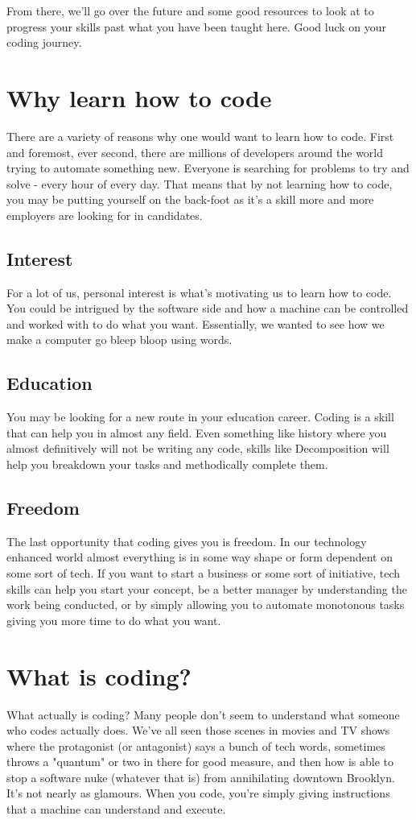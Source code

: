 \documentclass[12pt,a4paper]{book}
\begin{document}
		From there, we'll go over the future and some good resources to look at to progress your skills past what you have been taught here. Good luck on your coding journey.

	\chapter{Why learn how to code}  \label{chap:why-code}
		There are a variety of reasons why one would want to learn how to code. First and foremost, ever second, there are millions of developers around the world trying to automate something new. Everyone is searching for problems to try and solve - every hour of every day. That means that by not learning how to code, you may be putting yourself on the back-foot as it's a skill more and more employers are looking for in candidates.
		\section{Interest}
			For a lot of us, personal interest is what's motivating us to learn how to code. You could be intrigued by the software side and how a machine can be controlled and worked with to do what you want. Essentially, we wanted to see how we make a computer go bleep bloop using words.
		\section{Education}
			You may be looking for a new route in your education career. Coding is a skill that can help you in almost any field. Even something like history where you almost definitively will not be writing any code, skills like Decomposition will help you breakdown your tasks and methodically complete them. 
		\section{Freedom}
			The last opportunity that coding gives you is freedom. In our technology enhanced world almost everything is in some way shape or form dependent on some sort of tech. If you want to start a business or some sort of initiative, tech skills can help you start your concept, be a better manager by understanding the work being conducted, or by simply allowing you to automate monotonous tasks giving you more time to do what you want. 

	\chapter{What is coding?}  \label{chap:intro-coding}
		What actually is coding? Many people don't seem to understand what someone who  codes actually does. We've all seen those scenes in movies and TV shows where the protagonist (or antagonist) says a bunch of tech words, sometimes throws a "quantum" or two in there for good measure, and then how is able to stop a software nuke (whatever that is) from annihilating downtown Brooklyn. It's not nearly as glamours. When you code, you're simply giving instructions that a machine can understand and execute.
		
\end{document}
